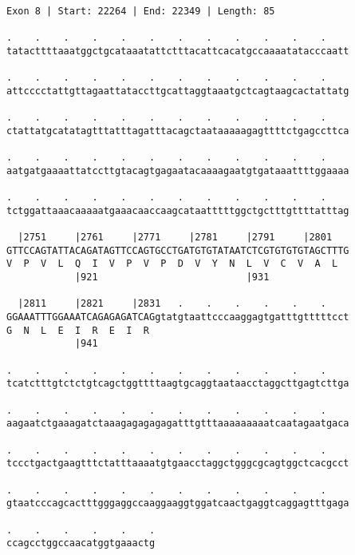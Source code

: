 \documentclass{article}
\begin{document}
\newpage
\begin{Verbatim}
Exon 8 | Start: 22264 | End: 22349 | Length: 85
 
.    .    .    .    .    .    .    .    .    .    .    .    
tatacttttaaatggctgcataaatattctttacattcacatgccaaaatatacccaatt
  
.    .    .    .    .    .    .    .    .    .    .    .    
attcccctattgttagaattataccttgcattaggtaaatgctcagtaagcactattatg
  
.    .    .    .    .    .    .    .    .    .    .    .    
ctattatgcatatagtttatttagatttacagctaataaaaagagttttctgagccttca
  
.    .    .    .    .    .    .    .    .    .    .    .    
aatgatgaaaattatccttgtacagtgagaatacaaaagaatgtgataaattttggaaaa
  
.    .    .    .    .    .    .    .    .    .    .    .    
tctggattaaacaaaaatgaaacaaccaagcataatttttggctgctttgttttatttag
  
  |2751     |2761     |2771     |2781     |2791     |2801   
GTTCCAGTATTACAGATAGTTCCAGTGCCTGATGTGTATAATCTCGTGTGTGTAGCTTTG
V  P  V  L  Q  I  V  P  V  P  D  V  Y  N  L  V  C  V  A  L  
            |921                          |931              
  
  |2811     |2821     |2831   .    .    .    .    .    .    
GGAAATTTGGAAATCAGAGAGATCAGgtatgtaattcccaaggagtgatttgtttttcct
G  N  L  E  I  R  E  I  R                                   
            |941                                            
  
.    .    .    .    .    .    .    .    .    .    .    .    
tcatctttgtctctgtcagctggttttaagtgcaggtaataacctaggcttgagtcttga
  
.    .    .    .    .    .    .    .    .    .    .    .    
aagaatctgaaagatctaaagagagagagatttgtttaaaaaaaaatcaatagaatgaca
  
.    .    .    .    .    .    .    .    .    .    .    .    
tccctgactgaagtttctatttaaaatgtgaacctaggctgggcgcagtggctcacgcct
  
.    .    .    .    .    .    .    .    .    .    .    .    
gtaatcccagcactttgggaggccaaggaaggtggatcaactgaggtcaggagtttgaga
  
.    .    .    .    .    .
ccagcctggccaacatggtgaaactg
\end{Verbatim}
\newpage
\end{document}
